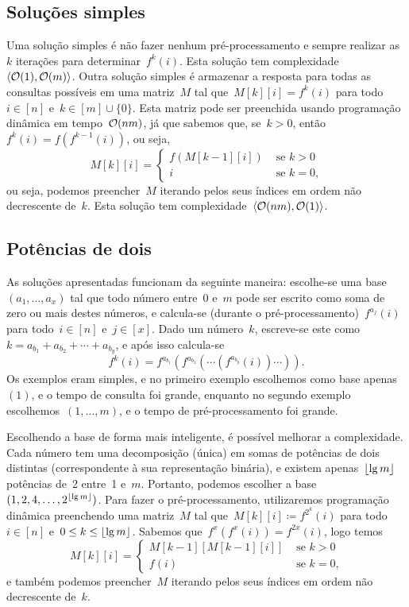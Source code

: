 \documentclass[main.tex]{subfiles}
\begin{document}
\subsection{Soluções simples}

Uma solução simples é não fazer nenhum pré-processamento e sempre realizar as~$k$ iterações para determinar~$f^k(i)$. Esta solução tem complexidade~$\langle\mathcal{O}(1),\mathcal{O}(m)\rangle$. Outra solução simples é armazenar a resposta para todas as consultas possíveis em uma matriz~$M$ tal que~$M[k][i] = f^k(i)$ para todo~$i \in [n]$ e~$k \in [m] \cup \{0\}$. Esta matriz pode ser preenchida usando programação dinâmica em tempo~$\mathcal{O}(nm)$, já que sabemos que, se~$k > 0$, então~$f^k(i) = f(f^{k-1}(i))$, ou seja,
$$M[k][i] = \left\{
	\begin{array}{ll}
		f(M[k - 1][i]) & \text{ se $k > 0$} \\
		i & \text{ se $k = 0$,}
	\end{array}
	\right.
$$
ou seja, podemos preencher~$M$ iterando pelos seus índices em ordem não decrescente de~$k$. Esta solução tem complexidade~$\langle\mathcal{O}(nm), \mathcal{O}(1)\rangle$.

\subsection{Potências de dois} \label{subsec:pot2}

As soluções apresentadas funcionam da seguinte maneira: escolhe-se uma base~$(a_1, \ldots, a_x)$ tal que todo número entre~0 e~$m$ pode ser escrito como soma de zero ou mais destes números, e calcula-se (durante o pré-processamento)~$f^{a_j}(i)$ para todo~$i \in [n]$ e~$j \in [x]$. Dado um número~$k$, escreve-se este como~$k = a_{b_1} + a_{b_2} + \cdots + a_{b_y}$, e após isso calcula-se
$$f^k(i) = f^{a_{b_1}}(f^{a_{b_2}}(\cdots(f^{a_{b_y}}(i))\cdots)).$$
Os exemplos eram simples, e no primeiro exemplo escolhemos como base apenas~$(1)$, e o tempo de consulta foi grande, enquanto no segundo exemplo escolhemos~$(1, \ldots, m)$, e o tempo de pré-processamento foi grande.

Escolhendo a base de forma mais inteligente, é possível melhorar a complexidade. Cada número tem uma decomposição (única) em somas de potências de dois distintas (correspondente à sua representação binária), e existem apenas~$\lfloor\lg m\rfloor$ potências de~2 entre~1 e~$m$. Portanto, podemos escolher a base~${(1, 2, 4, \ldots, 2^{\lfloor\lg m\rfloor})}$. Para fazer o pré-processamento, utilizaremos programação dinâmica preenchendo uma matriz~$M$ tal que~${M[k][i] \coloneqq f^{2^k}(i)}$ para todo~$i \in [n]$ e~$0 \leq k \leq \lfloor\lg m\rfloor$. Sabemos que~$f^x(f^x(i)) = f^{2x}(i)$, logo temos
$$M[k][i] = \left\{
	\begin{array}{ll}
		M[k-1][M[k - 1][i]] & \text{ se $k > 0$} \\
		f(i) & \text{ se $k = 0$,}
	\end{array}
	\right.
$$
e também podemos preencher~$M$ iterando pelos seus índices em ordem não decrescente de~$k$.
\end{document}
